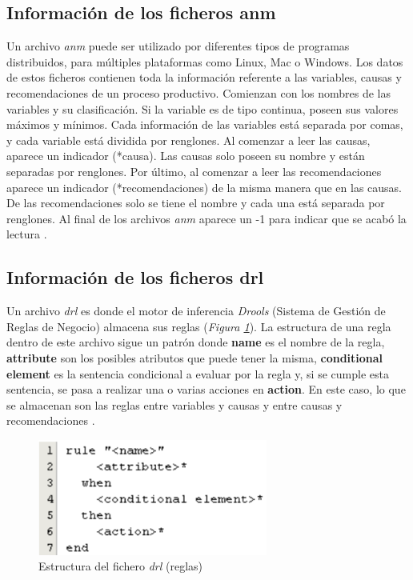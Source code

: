 \subsection{Información de los ficheros anm}
Un archivo \textsl{anm} puede ser utilizado por diferentes tipos de programas distribuidos, para múltiples plataformas como Linux, Mac o Windows. Los datos de estos ficheros contienen toda la información referente a las variables, causas y recomendaciones de un proceso productivo.
Comienzan con los nombres de las variables y su clasificación. Si la variable es de tipo continua, poseen sus valores máximos y mínimos. Cada información de las variables está separada por comas, y cada variable está dividida por renglones.
Al comenzar a leer las causas, aparece un indicador (*causa). Las causas solo poseen su nombre y están separadas por renglones. Por último, al comenzar a leer las recomendaciones aparece un indicador (*recomendaciones) de la misma manera que en las causas.
De las recomendaciones solo se tiene el nombre y cada una está separada por renglones.
Al final de los archivos \textsl{anm} aparece un -1 para indicar que se acabó la lectura \cite{Riveron2017}.

\subsection{Información de los ficheros drl}
Un archivo \textsl{drl} es donde el motor de inferencia \textsl{Drools} (Sistema de Gestión de Reglas de Negocio) almacena sus reglas (\textsl{Figura \ref{fig:reglas}}). La estructura de una regla dentro de este archivo sigue un patrón donde \textbf{name} es el nombre de la regla, \textbf{attribute} son los posibles atributos que puede tener la misma, \textbf{conditional element} es la sentencia condicional a evaluar por la regla y, si se cumple esta sentencia, se pasa a realizar una o varias acciones en \textbf{action}. En este caso, lo que se almacenan son  las reglas entre variables y causas y entre causas y recomendaciones \cite{Riveron2017}.

\begin{figure}[h]
\centering
 \includegraphics[width=0.5\linewidth]{imagen/rules.png}
 \caption{Estructura del fichero \textsl{drl} (reglas)}
 \label{fig:reglas} 
\end{figure}

